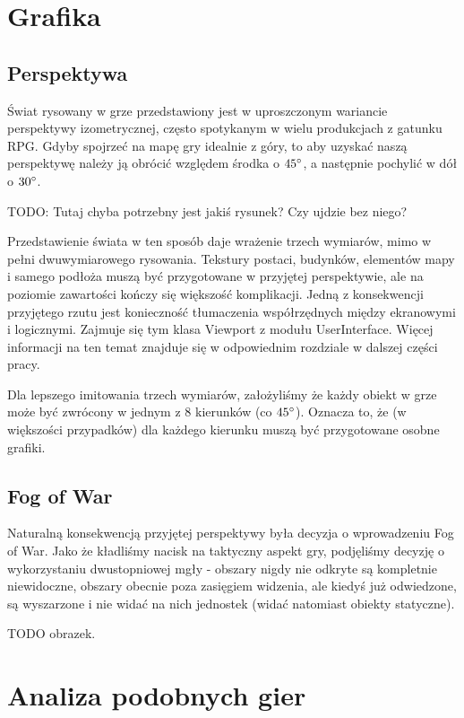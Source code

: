 \documentclass[licencjacka]{pracamgr}
\begin{document}
  \section{Grafika}
    \subsection{Perspektywa}
    Świat rysowany w grze przedstawiony jest w uproszczonym wariancie perspektywy izometrycznej, często spotykanym w
    wielu produkcjach z gatunku RPG. Gdyby spojrzeć na mapę gry idealnie z góry, to aby uzyskać naszą perspektywę należy
    ją obrócić względem środka o $45\degree$, a następnie pochylić w dół o $30\degree$.

    TODO: Tutaj chyba potrzebny jest jakiś rysunek? Czy ujdzie bez niego?

    Przedstawienie świata w ten sposób daje wrażenie trzech wymiarów, mimo w pełni dwuwymiarowego rysowania. Tekstury
    postaci, budynków, elementów mapy i samego podłoża muszą być przygotowane w przyjętej perspektywie, ale na poziomie
    zawartości kończy się większość komplikacji. Jedną z konsekwencji przyjętego rzutu jest konieczność tłumaczenia
    współrzędnych między ekranowymi i logicznymi. Zajmuje się tym klasa Viewport z modułu UserInterface. Więcej
    informacji na ten temat znajduje się w odpowiednim rozdziale w dalszej części pracy.

    Dla lepszego imitowania trzech wymiarów, założyliśmy że każdy obiekt w grze może być zwrócony w jednym z 8 kierunków
    (co $45\degree$). Oznacza to, że (w większości przypadków) dla każdego kierunku muszą być przygotowane osobne
    grafiki.

    \subsection{Fog of War}
    Naturalną konsekwencją przyjętej perspektywy była decyzja o wprowadzeniu Fog of War. Jako że kładliśmy nacisk na
    taktyczny aspekt gry, podjęliśmy decyzję o wykorzystaniu dwustopniowej mgły - obszary nigdy nie odkryte są
    kompletnie niewidoczne, obszary obecnie poza zasięgiem widzenia, ale kiedyś już odwiedzone, są wyszarzone i nie
    widać na nich jednostek (widać natomiast obiekty statyczne).

    TODO obrazek.

  \section{Analiza podobnych gier}
\end{document}
